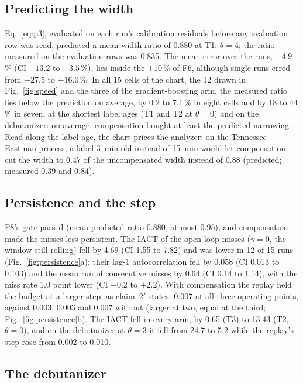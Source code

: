 \subsection{Predicting the width}\label{sec:results:p3}

Eq.~\eqref{eq:p3}, evaluated on each run's calibration residuals before any evaluation row was
read, predicted a mean width ratio of 0.880 at T1, $\theta = 4$; the ratio measured on the
evaluation rows was 0.835. The mean error over the runs, $-4.9$\,\% (CI $-13.2$ to $+3.5$\,\%),
lies inside the $\pm 10$\,\% of F6, although single runs erred from $-27.5$ to $+16.0$\,\%. In all
15 cells of the chart, the 12 drawn in Fig.~\ref{fig:speed} and the three of the gradient-boosting
arm, the measured ratio lies below the prediction on average, by 0.2 to 7.1\,\% in eight cells and
by 18 to 44\,\% in seven, at the shortest label ages (T1 and T2 at $\theta = 0$) and on the
debutanizer: on average, compensation bought at least the predicted narrowing. Read along the label age, the chart prices the analyzer: on the Tennessee Eastman
process, a label 3~min old instead of 15~min would let compensation cut the width to 0.47 of the
uncompensated width instead of 0.88 (predicted; measured 0.39 and 0.84).

\subsection{Persistence and the step}\label{sec:results:persistence}

F8's gate passed (mean predicted ratio 0.880, at most 0.95), and compensation made the misses less
persistent. The IACT of the open-loop misses ($\gamma = 0$, the window still rolling) fell by 4.69
(CI 1.55 to 7.82) and was lower in 12 of 15 runs (Fig.~\ref{fig:persistence}a); their lag-1
autocorrelation fell by 0.058 (CI 0.013 to 0.103) and the mean run of consecutive misses by 0.64
(CI 0.14 to 1.14), with the miss rate 1.0 point lower (CI $-0.2$ to $+2.2$). With compensation the
replay held the budget at a larger step, as claim~2$'$ states: 0.007 at all three operating points,
against 0.003, 0.003 and 0.007 without (larger at two, equal at the third;
Fig.~\ref{fig:persistence}b). The IACT fell in every arm, by 0.65 (T3) to 13.43 (T2,
$\theta = 0$), and on the debutanizer at $\theta = 3$ it fell from 24.7 to 5.2 while the replay's
step rose from 0.002 to 0.010.

\subsection{The debutanizer}\label{sec:results:debutanizer}

